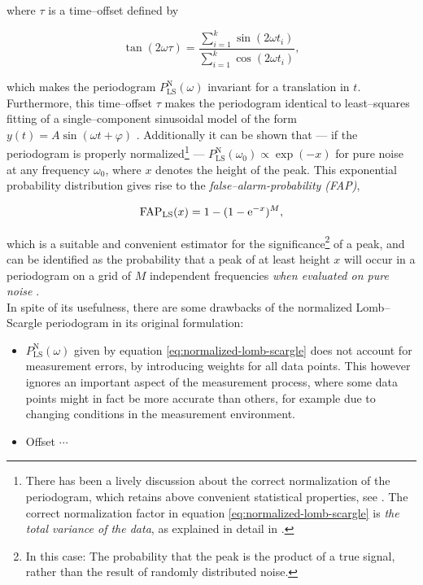 where $\tau$ is a time--offset defined by

\begin{equation}
\tan(2 \omega \tau) = \frac{\sum\limits_{i=1}^k \sin(2 \omega t_i)}{\sum\limits_{i=1}^k \cos(2 \omega t_i)},
\end{equation}

which makes the periodogram $P^{\text{N}}_{\text{LS}}(\omega)$ invariant for a translation in $t$. Furthermore, this time--offset $\tau$ makes the periodogram identical to least--squares fitting of a single--component sinusoidal model of the form $y(t) = A \sin(\omega t + \varphi)$ \citep{horne1986, vanderplas2015}. Additionally it can be shown that --- if the periodogram is properly normalized\footnote{There has been a lively discussion about the correct normalization of the periodogram, which retains above convenient statistical properties, see \citet{lomb1976,astroML,zechmeister2009}. The correct normalization factor in equation \eqref{eq:normalized-lomb-scargle} is \emph{the total variance of the data}, as explained in detail in \citet{horne1986}.} --- $P^{\text{N}}_{\text{LS}}(\omega_0) \propto \exp(-x)$ for pure noise at any frequency $\omega_0$, where $x$ denotes the height of the peak. This exponential probability distribution gives rise to the \emph{false--alarm-probability (FAP)},

\begin{equation}
\text{FAP}_{\text{LS}}(x) = 1 - (1 - \mathrm{e}^{-x})^M,
\end{equation}

which is a suitable and convenient estimator for the significance\footnote{In this case: The probability that the peak is the product of a true signal, rather than the result of randomly distributed noise.} of a peak, and can be identified as the probability that a peak of at least height $x$ will occur in a periodogram on a grid of $M$ independent frequencies \emph{when evaluated on pure noise} \citep{horne1986}.\\

In spite of its usefulness, there are some drawbacks of the normalized Lomb--Scargle periodogram in its original formulation:

\begin{itemize}
\item $P^{\text{N}}_{\text{LS}}(\omega)$ given by equation \eqref{eq:normalized-lomb-scargle} does not account for measurement errors, \eg by introducing weights for all data points. This however ignores an important aspect of the measurement process, where some data points might in fact be more accurate than others, for example due to changing conditions in the measurement environment.
\item Offset $\cdots$ %
\end{itemize}

